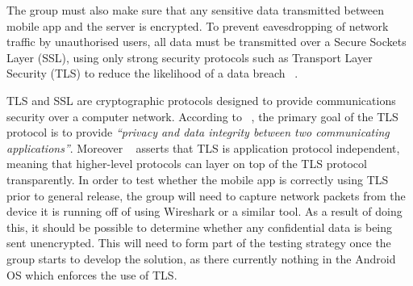 The group must also make sure that any sensitive data transmitted between mobile app and the server is encrypted. To prevent eavesdropping of network traffic by unauthorised users, all data must be transmitted over a Secure Sockets Layer (SSL), using only strong security protocols such as Transport Layer Security (TLS) to reduce the likelihood of a data breach ~\parencite{web:data_encryption_in_transit}.

TLS and SSL are cryptographic protocols designed to provide communications security over a computer network. According to ~\textcite{web:tls_protocol}, the primary goal of the TLS protocol is to provide \emph{``privacy and data integrity between two communicating applications''}. Moreover ~\textcite{web:tls_protocol} asserts that TLS is application protocol independent, meaning that higher-level protocols can layer on top of the TLS protocol transparently. In order to test whether the mobile app is correctly using TLS prior to general release, the group will need to capture network packets from the device it is running off of using Wireshark or a similar tool. As a result of doing this, it should be possible to determine whether any confidential data is being sent unencrypted. This will need to form part of the testing strategy once the group starts to develop the solution, as there currently nothing in the Android OS which enforces the use of TLS. 